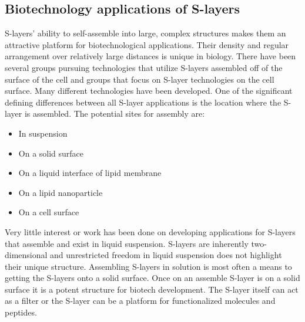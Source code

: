   \subsection{Biotechnology applications of S-layers}\label{sec:biot-appl-s} 
  
  \Acp{S-layer}' ability to self-assemble into large, complex structures makes them  an attractive platform for biotechnological applications. Their density and regular arrangement over relatively large distances is unique in biology. There have been several groups pursuing technologies that utilize \acp{S-layer} assembled off of the surface of the cell and groups that focus on \ac{S-layer} technologies on the cell surface. Many different technologies have been developed.
  One of the significant defining differences between all \ac{S-layer} applications is the location where the \ac{S-layer} is assembled. The potential sites for assembly are:
  \begin{itemize}
  \item In suspension
  \item On a solid surface
  \item On a liquid interface of lipid membrane
  \item On a lipid nanoparticle
  \item On a cell surface
  \end{itemize}

  Very little interest or work has been done on developing applications for \acp{S-layer} that assemble and exist in liquid suspension. \Acp{S-layer} are inherently two-dimensional and unrestricted freedom in liquid suspension does not highlight their unique structure. Assembling \acp{S-layer} in solution is most often a means to getting the \acp{S-layer} onto a solid surface. Once on an assemble \ac{S-layer} is on a solid surface it is a potent structure for biotech development. The \ac{S-layer} itself can act as a filter or the \ac{S-layer} can be a platform for functionalized molecules and peptides.

